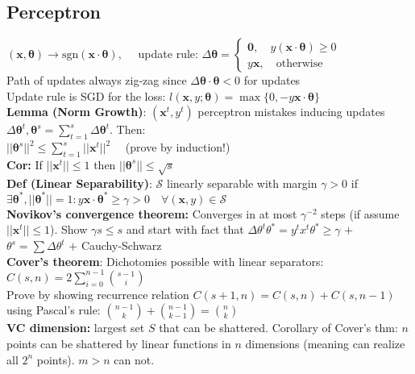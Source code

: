 \subsection*{Perceptron}
$(\mathbf{x,\theta})\rightarrow \text{sgn}(\mathbf{x\cdot\theta}),\quad$  update rule: $\Delta\mathbf{\theta}=\begin{cases} 
       \mathbf{0}, \quad y(\mathbf{x\cdot\theta})\geq 0\\
       y\mathbf x, \quad \text{otherwise}
       \end{cases}$\\
Path of updates always zig-zag since $\Delta\mathbf{\theta\cdot\theta}<0$ for updates \\
Update rule is SGD for the loss: $l(\mathbf x,y;\mathbf\theta)=\max\{0,-y\mathbf{x\cdot\theta}\}$\\
\textbf{Lemma (Norm Growth)}: $(\mathbf x^t, y^t)$ perceptron mistakes inducing updates $\Delta\mathbf\theta^t, \mathbf\theta^s=\sum_{t=1}^s\Delta\mathbf\theta^t$. Then:\\
$||\mathbf\theta^s||^2\leq\sum_{t=1}^s||\mathbf x^t||^2 \quad$ (prove by induction!)\\
\textbf{Cor: } If $||\mathbf x^t||\leq 1$ then $||\mathbf\theta^s||\leq\sqrt s$\\
\textbf{Def (Linear Separability)}:  $\mathcal{S}$ linearly separable with margin $\gamma>0$ if $\exists \mathbf\theta^*, ||\mathbf\theta^*||=1:y\mathbf{x\cdot\theta^*}\geq\gamma>0 \quad \forall(\mathbf x, y)\in\mathcal S$\\
\textbf{Novikov's convergence theorem:} Converges in at most $\gamma^{-2}$ steps (if assume $||\mathbf x^t||\leq 1$). Show $\gamma s\leq s$ and start with fact that $\Delta\theta^t\theta^* = y^tx^t\theta^*\geq \gamma$ $+$ $\theta^s=\sum\Delta\theta^t$ $+$ Cauchy-Schwarz\\
\textbf{Cover's theorem}: Dichotomies possible with linear separators: $C(s,n)=2\sum_{i=0}^{n-1} {s-1\choose i}$\\
Prove by showing recurrence relation $C(s+1,n)=C(s,n)+C(s,n-1)$ using Pascal's rule: ${n-1 \choose k} + {n-1 \choose k-1}={n \choose k}$\\
\textbf{VC dimension:} largest set $S$ that can be shattered. Corollary of Cover's thm: $n$ points can be shattered by linear functions in $n$ dimensions (meaning can realize all $2^n$ points). $m>n$ can not.
